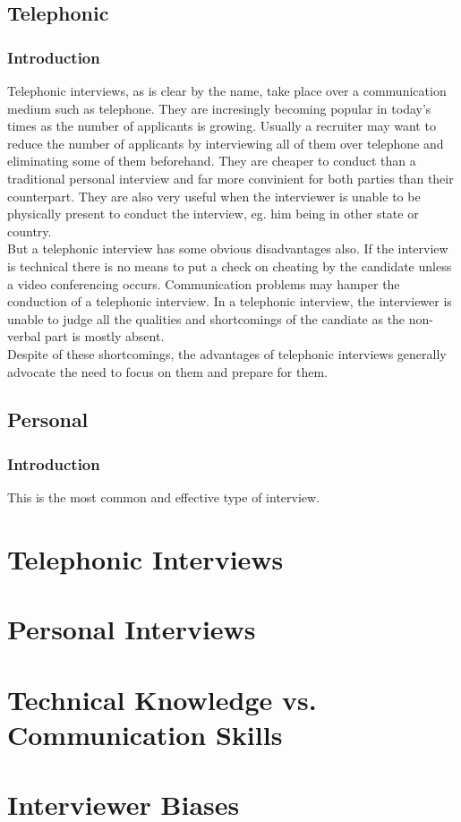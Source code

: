 \documentclass[a4paper,12pt]{report}
\begin{document}
\section{Telephonic}     %
\subsection{Introduction}  %
Telephonic interviews, as is clear by the name, take place over a communication medium such as telephone.
They are incresingly becoming popular in today's times as the number of applicants is growing. Usually a
recruiter may want to reduce the number of applicants by interviewing all of them over telephone and eliminating
some of them beforehand. They are cheaper to conduct than a traditional personal interview and far more convinient
for both parties than their counterpart. They are also very useful when the interviewer is unable to be physically
present to conduct the interview, eg. him being in other state or country.\\
But a telephonic interview has some obvious disadvantages also. If the interview is technical there is no
means to put a check on cheating by the candidate unless a video conferencing occurs. Communication problems
may hamper the conduction of a telephonic interview. In a telephonic interview, the interviewer is unable to
judge all the qualities and shortcomings of the candiate as the non-verbal part is mostly absent.\\
Despite of these shortcomings, the advantages of telephonic interviews generally advocate the need to focus
on them and prepare for them.
\section{Personal}         %
\subsection{Introduction}  %
This is the most common and effective type of interview.
\chapter{Telephonic Interviews}
\chapter{Personal Interviews}
\appendix
\chapter{Technical Knowledge vs. Communication Skills}
\chapter{Interviewer Biases}
\begin{thebibliography}{9}
\end{thebibliography}
\end{document}
